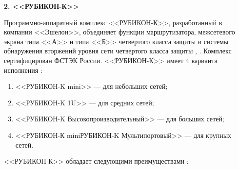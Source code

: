 \begin{center}
	\textbf{\Large 2. <<РУБИКОН-К>>}
\end{center}

Программно-аппаратный комплекс <<РУБИКОН-К>>, разработанный в компании <<Эшелон>>, объединяет функции маршрутизатора, межсетевого экрана типа <<А>> и типа <<Б>> четвертого класса защиты и системы обнаружения вторжений уровня сети четвертого класса защиты \cite{fw4a}, \cite{fw4b}. Комплекс сертифицирован ФСТЭК России. <<РУБИКОН-К>> имеет 4 варианта исполнения \cite{rubicon}:
\begin{enumerate}
	\item <<РУБИКОН-K mini>> --- для небольших сетей;
	
	\item <<РУБИКОН-K 1U>> --- для средних сетей;
		
	\item <<РУБИКОН-K Высокопроизводительный>> --- для больших сетей;
			
	\item <<РУБИКОН-К miniРУБИКОН-K Мультипортовый>> --- для крупных сетей.
\end{enumerate}
	
\noindent <<РУБИКОН-К>> обладает следующими преимуществами \cite{rubicon}:

